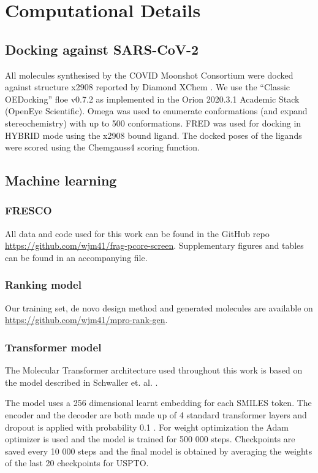 \chapter{Computational Details} \label{appendix:details}

\section{Docking against SARS-CoV-2} \label{subsec:docking}
All molecules synthesised by the COVID Moonshot Consortium were docked against structure x2908 reported by Diamond XChem \cite{Douangamath2020XChem}. We use the “Classic OEDocking” floe v0.7.2 as implemented in the Orion 2020.3.1 Academic Stack (OpenEye Scientific). Omega was used to enumerate conformations (and expand stereochemistry) with up to 500 conformations. FRED was used for docking in HYBRID mode using the x2908 bound ligand. The docked poses of the ligands were scored using the Chemgauss4 scoring function.

\section{Machine learning}
\subsection{FRESCO}
All data and code used for this work can be found in the GitHub repo \url{https://github.com/wjm41/frag-pcore-screen}. Supplementary figures and tables can be found in an accompanying file.

\subsection{Ranking model}
Our training set, de novo design method and generated molecules are available on \url{https://github.com/wjm41/mpro-rank-gen}.

\subsection{Transformer model}
The Molecular Transformer architecture used throughout this work is based on the model described in Schwaller et. al. \cite{Schwaller2019MolecularPrediction}. 

The model uses a 256 dimensional learnt embedding for each SMILES token. The encoder and the decoder are both made up of 4 standard transformer layers and dropout is applied with probability 0.1 \cite{Srivastava2014Dropout:Overfittin}. For weight optimization the Adam optimizer is used and the model is trained for 500 000 steps. Checkpoints are saved every 10 000 steps and the final model is obtained by averaging the weights of the last 20 checkpoints for USPTO.

